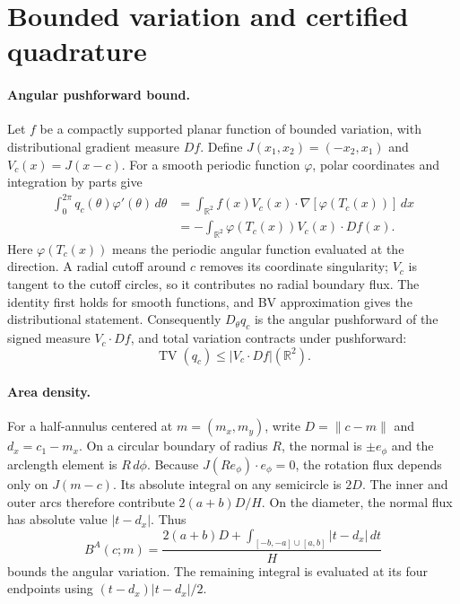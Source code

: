 \section{Bounded variation and certified quadrature}
\label{supp:bv}

\paragraph{Angular pushforward bound.}
Let $f$ be a compactly supported planar function of bounded variation, with distributional gradient measure $Df$. Define $J(x_1,x_2)=(-x_2,x_1)$ and $V_c(x)=J(x-c)$. For a smooth periodic function $\varphi$, polar coordinates and integration by parts give
\begin{align*}
 \int_0^{2\pi}q_c(\theta)\varphi'(\theta)\,d\theta
 &=\int_{\mathbb R^2} f(x)V_c(x)\cdot
                    \nabla[\varphi(T_c(x))]\,dx\\
 &=-\int_{\mathbb R^2}\varphi(T_c(x))V_c(x)\cdot Df(x).
\end{align*}
Here $\varphi(T_c(x))$ means the periodic angular function evaluated at the direction. A radial cutoff around $c$ removes its coordinate singularity; $V_c$ is tangent to the cutoff circles, so it contributes no radial boundary flux. The identity first holds for smooth functions, and BV approximation gives the distributional statement. Consequently $D_\theta q_c$ is the angular pushforward of the signed measure $V_c\cdot Df$, and total variation contracts under pushforward:
\begin{equation}
 \operatorname{TV}(q_c)\leq
 |V_c\cdot Df|(\mathbb R^2).
 \label{supp:eq:angular-bv}
\end{equation}

\paragraph{Area density.}
For a half-annulus centered at $m=(m_x,m_y)$, write $D=\|c-m\|$ and $d_x=c_1-m_x$. On a circular boundary of radius $R$, the normal is $\pm e_\phi$ and the arclength element is $R\,d\phi$. Because $J(Re_\phi)\cdot e_\phi=0$, the rotation flux depends only on $J(m-c)$. Its absolute integral on any semicircle is $2D$. The inner and outer arcs therefore contribute $2(a+b)D/H$. On the diameter, the normal flux has absolute value $|t-d_x|$. Thus
\begin{equation}
 B^A(c;m)=\frac{2(a+b)D+
       \displaystyle\int_{[-b,-a]\cup[a,b]}|t-d_x|\,dt}{H}
 \label{supp:eq:bv-area}
\end{equation}
bounds the angular variation. The remaining integral is evaluated at its four endpoints using $(t-d_x)|t-d_x|/2$.

